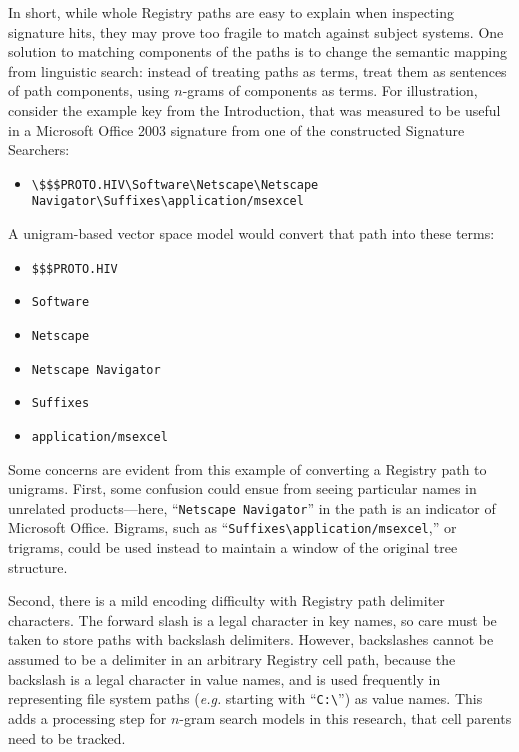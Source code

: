 \documentclass[11pt]{ucthesis}
\theoremstyle{plain}
\theoremstyle{definition}
\newcommand{\eg}{\emph{e.g.}\xspace}
\newcommand{\breakingbackslash}{\textbackslash\allowbreak{}}
\begin{document}
In short, while whole Registry paths are easy to explain when inspecting signature hits, they may prove too fragile to match against subject systems.  One solution to matching components of the paths is to change the semantic mapping from linguistic search: instead of treating paths as terms, treat them as sentences of path components, using $n$-grams of components as terms.  For illustration, consider the example key from the Introduction, that was measured to be useful in a Microsoft Office 2003 signature from one of the constructed Signature Searchers:

\begin{itemize}
\item \texttt{{\breakingbackslash}\$\$\$PROTO.HIV{\breakingbackslash}Software{\breakingbackslash}Netscape{\breakingbackslash}Netscape Navigator{\breakingbackslash}{\newline}Suffixes{\breakingbackslash}application/msexcel}
\end{itemize}

A unigram-based vector space model would convert that path into these terms:

\begin{itemize}
\item \texttt{\$\$\$PROTO.HIV}
\item \texttt{Software}
\item \texttt{Netscape}
\item \texttt{Netscape Navigator}
\item \texttt{Suffixes}
\item \texttt{application/msexcel}
\end{itemize}

Some concerns are evident from this example of converting a Registry path to unigrams.  First, some confusion could ensue from seeing particular names in unrelated products---here, ``\texttt{Netscape Navigator}'' in the path is an indicator of Microsoft Office.  Bigrams, such as ``\texttt{Suffixes{\breakingbackslash}application/msexcel},'' or trigrams, could be used instead to maintain a window of the original tree structure.

Second, there is a mild encoding difficulty with Registry path delimiter characters.  The forward slash is a legal character in key names, so care must be taken to store paths with backslash delimiters.  However, backslashes cannot be assumed to be a delimiter in an arbitrary Registry cell path, because the backslash is a legal character in value names, and is used frequently in representing file system paths (\eg starting with ``\texttt{C:{\breakingbackslash}}'') as value names.  This adds a processing step for $n$-gram search models in this research, that cell parents need to be tracked.
\end{document}
